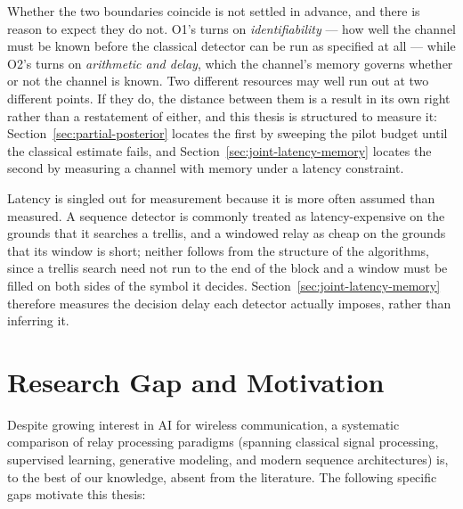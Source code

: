 Whether the two boundaries coincide is not settled in advance, and there is reason to expect they do not. O1's turns on \emph{identifiability} --- how well the channel must be known before the classical detector can be run as specified at all --- while O2's turns on \emph{arithmetic and delay}, which the channel's memory governs whether or not the channel is known. Two different resources may well run out at two different points. If they do, the distance between them is a result in its own right rather than a restatement of either, and this thesis is structured to measure it: Section~\ref{sec:partial-posterior} locates the first by sweeping the pilot budget until the classical estimate fails, and Section~\ref{sec:joint-latency-memory} locates the second by measuring a channel with memory under a latency constraint.

Latency is singled out for measurement because it is more often assumed than measured. A sequence detector is commonly treated as latency-expensive on the grounds that it searches a trellis, and a windowed relay as cheap on the grounds that its window is short; neither follows from the structure of the algorithms, since a trellis search need not run to the end of the block and a window must be filled on both sides of the symbol it decides. Section~\ref{sec:joint-latency-memory} therefore measures the decision delay each detector actually imposes, rather than inferring it.

\section{Research Gap and Motivation}\label{sec:research-gap-and-motivation}

Despite growing interest in AI for wireless communication, a systematic comparison of relay processing paradigms (spanning classical signal processing, supervised learning, generative modeling, and modern sequence architectures) is, to the best of our knowledge, absent from the literature. The following specific gaps motivate this thesis:

